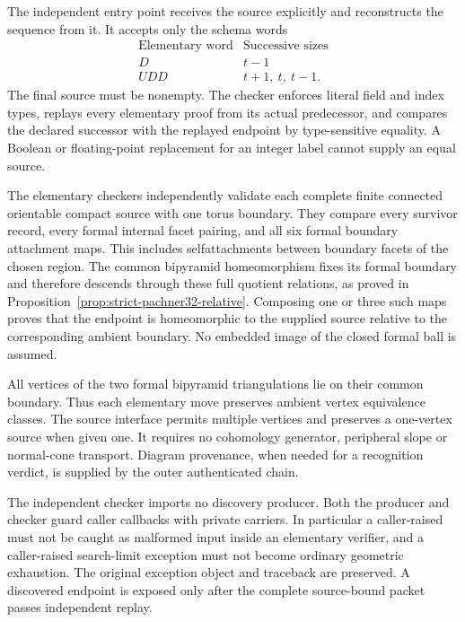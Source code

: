 The independent entry point 
receives the source explicitly and reconstructs the sequence from it.
It accepts only the schema words
\[
 \begin{array}{c|c}
 \text{Elementary word} & \text{Successive sizes}\\
 \hline
 D   & t-1\\
 UDD & t+1,\ t,\ t-1.
 \end{array}
\]
The final source must be nonempty.  The checker enforces literal field
and index types, replays every elementary proof from its actual
predecessor, and compares the declared successor with the replayed
endpoint by type-sensitive equality.  A Boolean or floating-point
replacement for an integer label cannot supply an equal source.

The elementary checkers independently validate each complete finite
connected orientable compact source with one torus boundary.  They
compare every survivor record, every formal internal facet pairing,
and all six formal boundary attachment maps.  This includes
selfattachments between boundary facets of the chosen region.
The common bipyramid homeomorphism fixes its formal boundary and
therefore descends through these full quotient relations, as proved
in Proposition~\ref{prop:strict-pachner32-relative}.  Composing one or
three such maps proves that the endpoint is homeomorphic to the
supplied source relative to the corresponding ambient boundary.
No embedded image of the closed formal ball is assumed.

All vertices of the two formal bipyramid triangulations lie on their
common boundary.  Thus each elementary move preserves ambient vertex
equivalence classes.  The source interface permits multiple vertices
and preserves a one-vertex source when given one.  It requires no
cohomology generator, peripheral slope or normal-cone transport.
Diagram provenance, when needed for a recognition verdict, is supplied
by the outer authenticated chain.

The independent checker imports no discovery producer.  Both the
producer and checker guard caller callbacks with private
 carriers.  In particular a caller-raised
 must not be caught as malformed input inside
an elementary verifier, and a caller-raised search-limit exception
must not become ordinary geometric exhaustion.  The original exception
object and traceback are preserved.  A discovered endpoint is exposed
only after the complete source-bound packet passes independent replay.

